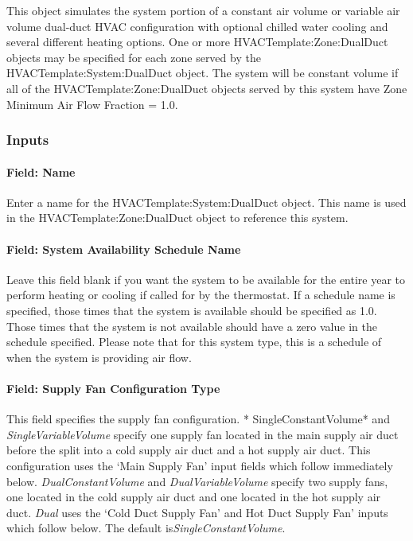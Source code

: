 This object simulates the system portion of a constant air volume or variable air volume dual-duct HVAC configuration with optional chilled water cooling and several different heating options. One or more HVACTemplate:Zone:DualDuct objects may be specified for each zone served by the HVACTemplate:System:DualDuct object. The system will be constant volume if all of the HVACTemplate:Zone:DualDuct objects served by this system have Zone Minimum Air Flow Fraction = 1.0.

\subsubsection{Inputs}\label{inputs-21-002}

\paragraph{Field: Name}\label{field-name-8-007}

Enter a name for the HVACTemplate:System:DualDuct object. This name is used in the HVACTemplate:Zone:DualDuct object to reference this system.

\paragraph{Field: System Availability Schedule Name}\label{field-system-availability-schedule-name-13}

Leave this field blank if you want the system to be available for the entire year to perform heating or cooling if called for by the thermostat. If a schedule name is specified, those times that the system is available should be specified as 1.0. Those times that the system is not available should have a zero value in the schedule specified. Please note that for this system type, this is a schedule of when the system is providing air flow.

\paragraph{Field: Supply Fan Configuration Type}\label{field-supply-fan-configuration-type}

This field specifies the supply fan configuration. * SingleConstantVolume* and \emph{SingleVariableVolume} specify one supply fan located in the main supply air duct before the split into a cold supply air duct and a hot supply air duct. This configuration uses the `Main Supply Fan' input fields which follow immediately below. \emph{DualConstantVolume} and \emph{DualVariableVolume} specify two supply fans, one located in the cold supply air duct and one located in the hot supply air duct. \emph{Dual} uses the `Cold Duct Supply Fan' and Hot Duct Supply Fan' inputs which follow below. The default is\emph{SingleConstantVolume}.

